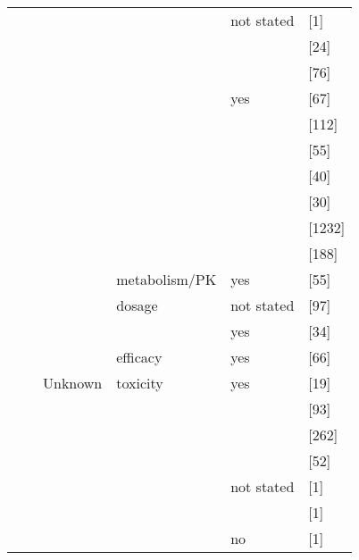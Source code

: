 \begin{center}
\begin{longtable}[H]{|l|l|l|l||l||l|}
\cline{5-6}
& & & & not stated & \citeauthor{pmid12172211} \citeyear{pmid12172211} [1] \\
\cline{6-6}
& & & & & \citeauthor{pmid10376773} \citeyear{pmid10376773} [24] \\
\cline{6-6}
& & & & & \citeauthor{Colleoni_2013} \citeyear{Colleoni_2013} [76] \\
\cline{5-6}
& & & & yes & \citeauthor{pmid9841604} \citeyear{pmid9841604} [67] \\
\cline{6-6}
& & & & & \citeauthor{pmid16044099} \citeyear{pmid16044099} [112] \\
\cline{6-6}
& & & & & \citeauthor{Hindorf_2004} \citeyear{Hindorf_2004} [55] \\
\cline{6-6}
& & & & & \citeauthor{pmid12509611} \citeyear{pmid12509611} [40] \\
\cline{6-6}
& & & & & \citeauthor{pmid10798786} \citeyear{pmid10798786} [30] \\
\cline{6-6}
& & & & & \citeauthor{pmid20593505} \citeyear{pmid20593505} [1232] \\
\cline{6-6}
& & & & & \citeauthor{Wroblova_2012} \citeyear{Wroblova_2012} [188] \\
\cline{4-6}
& & & metabolism/PK & yes & \citeauthor{Hindorf_2004} \citeyear{Hindorf_2004} [55] \\
\cline{4-6}
& & & dosage & not stated & \citeauthor{Gazouli_2010} \citeyear{Gazouli_2010} [97] \\
\cline{5-6}
& & & & yes & \citeauthor{Stocco_2005} \citeyear{Stocco_2005} [34] \\
\cline{4-6}
& & & efficacy & yes & \citeauthor{pmid9841604} \citeyear{pmid9841604} [66] \\
\cline{3-6}
& & Unknown & toxicity & yes & \citeauthor{Hawwa_2008} \citeyear{Hawwa_2008} [19] \\
\cline{6-6}
& & & & & \citeauthor{Liang_2013} \citeyear{Liang_2013} [93] \\
\cline{6-6}
& & & & & \citeauthor{Zelinkova_2006} \citeyear{Zelinkova_2006} [262] \\
\cline{6-6}
& & & & & \citeauthor{Gardiner_2008} \citeyear{Gardiner_2008} [52] \\
\cline{5-6}
& & & & not stated & \citeauthor{pmid12477776} \citeyear{pmid12477776} [1] \\
\cline{6-6}
& & & & & \citeauthor{Budhiraja_2011} \citeyear{Budhiraja_2011} [1] \\
\cline{5-6}
& & & & no & \citeauthor{cheung2003mistaken} \citeyear{cheung2003mistaken} [1] \\

\end{longtable}
\end{center}
